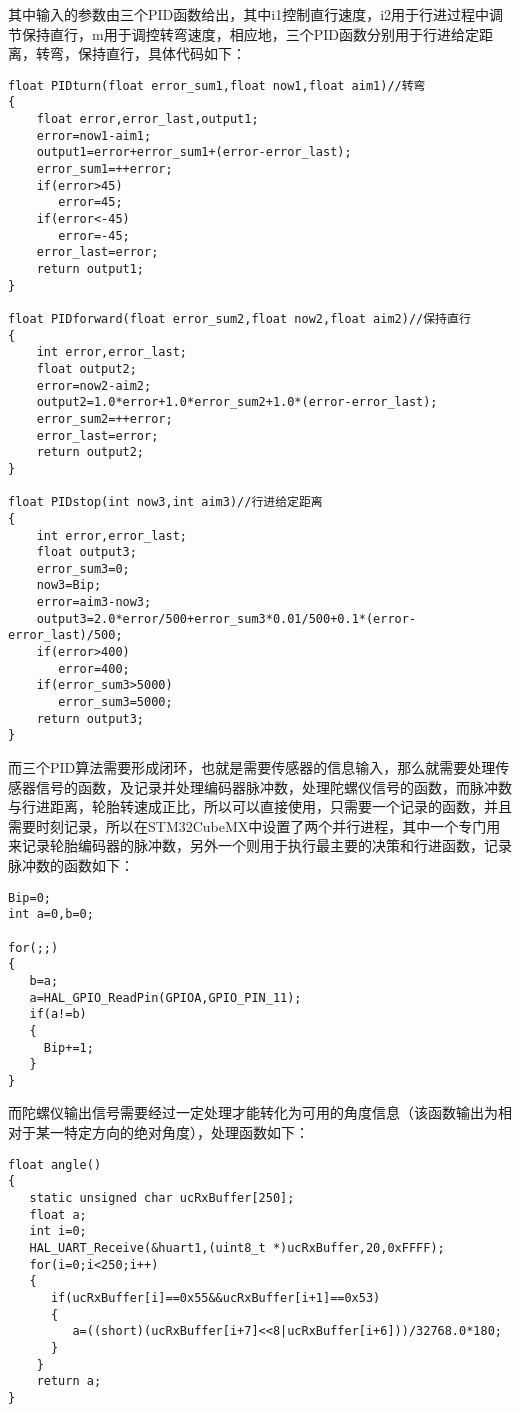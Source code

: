 \documentclass[UTF8]{ctexart}
\begin{document}
其中输入的参数由三个PID函数给出，其中i1控制直行速度，i2用于行进过程中调节保持直行，m用于调控转弯速度，相应地，三个PID函数分别用于行进给定距离，转弯，保持直行，具体代码如下：
\begin{lstlisting}
float PIDturn(float error_sum1,float now1,float aim1)//转弯
{
    float error,error_last,output1;
    error=now1-aim1;
    output1=error+error_sum1+(error-error_last);
    error_sum1=++error;
    if(error>45)
       error=45;
    if(error<-45)
       error=-45;
    error_last=error;
    return output1;
}

float PIDforward(float error_sum2,float now2,float aim2)//保持直行
{
    int error,error_last;
    float output2;
    error=now2-aim2;
    output2=1.0*error+1.0*error_sum2+1.0*(error-error_last);
    error_sum2=++error;
    error_last=error;
    return output2;
}

float PIDstop(int now3,int aim3)//行进给定距离
{
    int error,error_last;
    float output3;
    error_sum3=0;
    now3=Bip;
    error=aim3-now3;
    output3=2.0*error/500+error_sum3*0.01/500+0.1*(error-error_last)/500;
    if(error>400)
       error=400;
    if(error_sum3>5000)
       error_sum3=5000;
    return output3;
}
\end{lstlisting}

而三个PID算法需要形成闭环，也就是需要传感器的信息输入，那么就需要处理传感器信号的函数，及记录并处理编码器脉冲数，处理陀螺仪信号的函数，而脉冲数与行进距离，轮胎转速成正比，所以可以直接使用，只需要一个记录的函数，并且需要时刻记录，所以在STM32CubeMX中设置了两个并行进程，其中一个专门用来记录轮胎编码器的脉冲数，另外一个则用于执行最主要的决策和行进函数，记录脉冲数的函数如下：
\begin{lstlisting}
Bip=0;
int a=0,b=0;

for(;;)
{
   b=a;
   a=HAL_GPIO_ReadPin(GPIOA,GPIO_PIN_11);
   if(a!=b)
   {
     Bip+=1;
   }		
}
\end{lstlisting}

而陀螺仪输出信号需要经过一定处理才能转化为可用的角度信息（该函数输出为相对于某一特定方向的绝对角度），处理函数如下：
\begin{lstlisting}
float angle()
{
   static unsigned char ucRxBuffer[250];
   float a;
   int i=0;
   HAL_UART_Receive(&huart1,(uint8_t *)ucRxBuffer,20,0xFFFF);
   for(i=0;i<250;i++)
   {
      if(ucRxBuffer[i]==0x55&&ucRxBuffer[i+1]==0x53)
      {	
         a=((short)(ucRxBuffer[i+7]<<8|ucRxBuffer[i+6]))/32768.0*180;
      }
    }
    return a;
}
\end{lstlisting}
\end{document}
